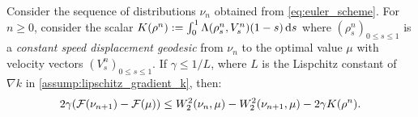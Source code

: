 \begin{proposition}\label{prop:evi}
	Consider the sequence of distributions $\nu_n$ obtained from \cref{eq:euler_scheme}. For $n\ge 0$, consider the scalar
	 $ K(\rho^n) :=  \int_0^1\Lambda(\rho_s^n,V_s^n)(1-s)\mathop{}\!\mathrm{d} s$ where $(\rho_s^n)_{0\leq s\leq 1}$ is a \textit{constant speed displacement geodesic} from $\nu_n$ to the optimal value $\mu$ with velocity vectors $(V_s^n)_{0\leq s\leq 1}$. If $\gamma \leq 1/L$, where $L$ is the Lispchitz constant of $\nabla k$ in \cref{assump:lipschitz_gradient_k}, then:
	\begin{align}
	2\gamma({{\mathcal F}}(\nu_{n+1})-{{\mathcal F}}(\mu))
	\leq 
	W_2^2(\nu_n,\mu)-W_2^2(\nu_{n+1},\mu)-2\gamma K(\rho^n).
	\label{eq:evi}
	\end{align}
\end{proposition}


